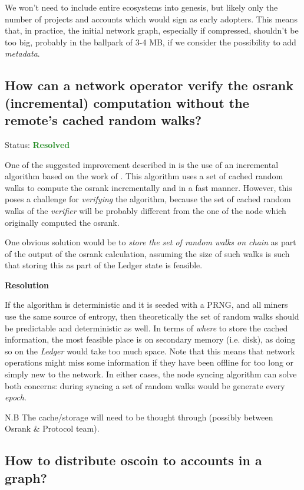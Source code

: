 \documentclass{article}
\begin{document}
We won't need to include entire ecosystems into genesis, but likely only
the number of projects and accounts which would sign as early adopters. This
means that, in practice, the initial network graph, especially if compressed,
shouldn't be too big, probably in the ballpark of 3-4 MB, if we
consider the possibility to add \textit{metadata}.

\subsection{How can a network operator verify the osrank (incremental) computation without the remote's cached random walks?}

Status: \textcolor{ForestGreen}{\textbf{Resolved}}

One of the suggested improvement described in \citep{opensourcecoin2019} is
the use of an incremental algorithm based on the work of
\citep{bahmani10pagerank}. This algorithm uses a set of cached random walks
to compute the osrank incrementally and in a fast manner. However, this
poses a challenge for \textit{verifying} the algorithm, because the set of
cached random walks of the \textit{verifier} will be probably different from
the one of the node which originally computed the osrank.

One obvious solution would be to
\textit{store the set of random walks on chain} as part of the output of the
osrank calculation, assuming the size of such walks is such that storing this
as part of the Ledger state is feasible.

\textbf{Resolution}

If the algorithm is deterministic and it is seeded with a PRNG, and all miners
use the same source of entropy, then theoretically the set of random walks
should be predictable and deterministic as well. In terms of \textit{where}
to store the cached information, the most feasible place is on secondary
memory (i.e. disk), as doing so on the \textit{Ledger} would take too much
space. Note that this means that network operations might miss some
information if they have been offline for too long or simply new to the
network. In either cases, the node syncing algorithm can solve both
concerns: during syncing a set of random walks would be generate every
\textit{epoch}.

N.B The cache/storage will need to be thought through
(possibly between Osrank \& Protocol team).

\subsection{How to distribute oscoin to accounts in a graph?}
\end{document}
